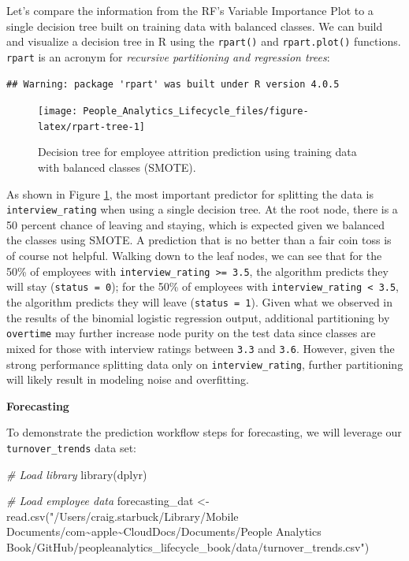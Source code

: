 \documentclass[
]{book}
\newenvironment{Shaded}{\begin{snugshade}}{\end{snugshade}}
\newcommand{\CommentTok}[1]{\textcolor[rgb]{0.56,0.35,0.01}{\textit{#1}}}
\newcommand{\FunctionTok}[1]{\textcolor[rgb]{0.00,0.00,0.00}{#1}}
\newcommand{\NormalTok}[1]{#1}
\newcommand{\OtherTok}[1]{\textcolor[rgb]{0.56,0.35,0.01}{#1}}
\newcommand{\StringTok}[1]{\textcolor[rgb]{0.31,0.60,0.02}{#1}}
\begin{document}
Let's compare the information from the RF's Variable Importance Plot to a single decision tree built on training data with balanced classes. We can build and visualize a decision tree in R using the \texttt{rpart()} and \texttt{rpart.plot()} functions. \texttt{rpart} is an acronym for \emph{recursive partitioning and regression trees}:

\begin{verbatim}
## Warning: package 'rpart' was built under R version 4.0.5
\end{verbatim}

\begin{figure}

{\centering \texttt{[image: People\_Analytics\_Lifecycle\_files/figure-latex/rpart-tree-1]} 

}

\caption{Decision tree for employee attrition prediction using training data with balanced classes (SMOTE).}\label{fig:rpart-tree}
\end{figure}

As shown in Figure \ref{fig:rpart-tree}, the most important predictor for splitting the data is \texttt{interview\_rating} when using a single decision tree. At the root node, there is a 50 percent chance of leaving and staying, which is expected given we balanced the classes using SMOTE. A prediction that is no better than a fair coin toss is of course not helpful. Walking down to the leaf nodes, we can see that for the 50\% of employees with \texttt{interview\_rating\ \textgreater{}=\ 3.5}, the algorithm predicts they will stay (\texttt{status\ =\ 0}); for the 50\% of employees with \texttt{interview\_rating\ \textless{}\ 3.5}, the algorithm predicts they will leave (\texttt{status\ =\ 1}). Given what we observed in the results of the binomial logistic regression output, additional partitioning by \texttt{overtime} may further increase node purity on the test data since classes are mixed for those with interview ratings between \texttt{3.3} and \texttt{3.6}. However, given the strong performance splitting data only on \texttt{interview\_rating}, further partitioning will likely result in modeling noise and overfitting.

\textbf{Forecasting}

To demonstrate the prediction workflow steps for forecasting, we will leverage our \texttt{turnover\_trends} data set:

\begin{Shaded}
\begin{Highlighting}[]
\CommentTok{\# Load library}
\FunctionTok{library}\NormalTok{(dplyr)}

\CommentTok{\# Load employee data}
\NormalTok{forecasting\_dat }\OtherTok{\textless{}{-}} \FunctionTok{read.csv}\NormalTok{(}\StringTok{"/Users/craig.starbuck/Library/Mobile Documents/com\textasciitilde{}apple\textasciitilde{}CloudDocs/Documents/People Analytics Book/GitHub/peopleanalytics\_lifecycle\_book/data/turnover\_trends.csv"}\NormalTok{)}
\end{Highlighting}
\end{Shaded}
\end{document}
